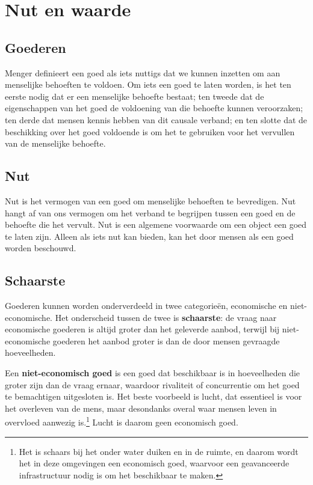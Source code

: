 \section{Nut en waarde}
\subsection{Goederen}

\nottooshort Menger definieert een goed als iets nuttigs dat we kunnen inzetten om aan menselijke behoeften te voldoen. Om iets een goed te laten worden, is het ten eerste nodig dat er een menselijke behoefte bestaat; ten tweede dat de eigenschappen van het goed de voldoening van die behoefte kunnen veroorzaken; ten derde dat mensen kennis hebben van dit causale verband; en ten slotte dat de beschikking over het goed voldoende is om het te gebruiken voor het vervullen van de menselijke behoefte.

\subsection{Nut}

Nut is het vermogen van een goed om menselijke behoeften te bevredigen. Nut hangt af van ons vermogen om het verband te begrijpen tussen een goed en de behoefte die het vervult. Nut is een algemene voorwaarde om een object een goed te laten zijn. Alleen als iets nut kan bieden, kan het door mensen als een goed worden beschouwd.

\subsection{Schaarste}
Goederen kunnen worden onderverdeeld in twee categorieën, economische en niet-economische. Het onderscheid tussen de twee is \textbf{schaarste}: de vraag naar economische goederen is altijd groter dan het geleverde aanbod, terwijl bij niet-economische goederen het aanbod groter is dan de door mensen gevraagde hoeveelheden. 

Een \textbf{niet-economisch goed} is een goed dat beschikbaar is in hoeveelheden die groter zijn dan de vraag ernaar, waardoor rivaliteit of concurrentie om het goed te bemachtigen uitgesloten is. Het beste voorbeeld is lucht, dat essentieel is voor het overleven van de mens, maar desondanks overal waar mensen leven in overvloed aanwezig is.\footnote{Het is schaars bij het onder water duiken en in de ruimte, en daarom wordt het in deze omgevingen een economisch goed, waarvoor een geavanceerde infrastructuur nodig is om het beschikbaar te maken.} Lucht is daarom geen economisch goed.

